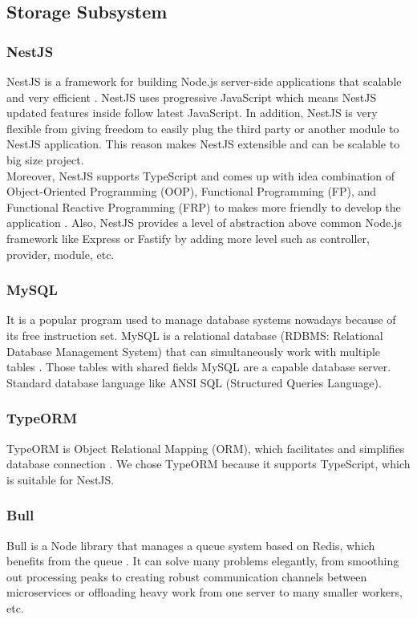 \documentclass[12pt,oneside,openright,a4paper]{cpe-english-project}
\begin{document}
\subsection{ Storage Subsystem}
\subsubsection{NestJS}
NestJS is a framework for building Node.js server-side applications that scalable and very
efficient \cite{nestjs_beautiful}. NestJS uses progressive JavaScript which means NestJS updated
features inside follow latest JavaScript. In addition, NestJS is very flexible from giving
freedom to easily plug the third party or another module to NestJS application. This reason
makes NestJS extensible and can be scalable to big size project.\\
Moreover, NestJS supports TypeScript and comes up with idea combination of Object-Oriented
Programming (OOP), Functional Programming (FP), and Functional Reactive Programming (FRP)
to makes more friendly to develop the application \cite{nestjs_beautiful}. Also, NestJS
provides a level of abstraction above common Node.js framework like Express or
Fastify by adding more level such as controller, provider, module, etc.

\subsubsection{MySQL}
It is a popular program used to manage database systems nowadays because of its free instruction
set. MySQL is a relational database (RDBMS: Relational Database Management System) that can
simultaneously work with multiple tables \cite{what_is_mysql}. Those tables with shared fields
MySQL are a capable database server. Standard database language like ANSI SQL
(Structured Queries Language).

\subsubsection{TypeORM}
TypeORM is Object Relational Mapping (ORM), which facilitates and simplifies database connection \cite{typeorm}.
We chose TypeORM because it supports TypeScript, which is suitable for NestJS.

\subsubsection{Bull}
Bull is a Node library that manages a queue system based on Redis, which benefits from the queue
\cite{job_queue_management_bull}. It can solve many problems elegantly, from smoothing out processing peaks to creating
robust communication channels between microservices or offloading heavy work from one server to
many smaller workers, etc.
\end{document}
